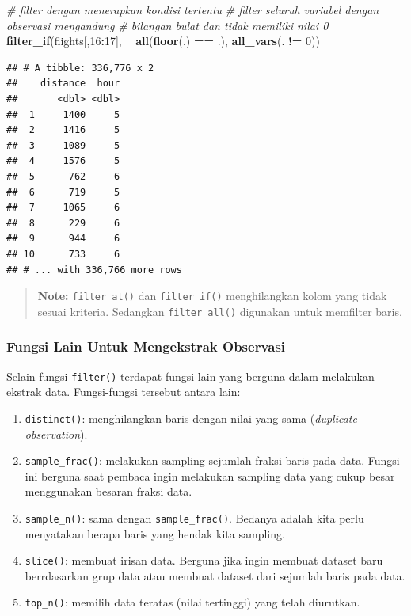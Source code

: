 \documentclass[]{book}
\newenvironment{Shaded}{\begin{snugshade}}{\end{snugshade}}
\newcommand{\KeywordTok}[1]{\textcolor[rgb]{0.13,0.29,0.53}{\textbf{#1}}}
\newcommand{\DecValTok}[1]{\textcolor[rgb]{0.00,0.00,0.81}{#1}}
\newcommand{\StringTok}[1]{\textcolor[rgb]{0.31,0.60,0.02}{#1}}
\newcommand{\CommentTok}[1]{\textcolor[rgb]{0.56,0.35,0.01}{\textit{#1}}}
\newcommand{\OperatorTok}[1]{\textcolor[rgb]{0.81,0.36,0.00}{\textbf{#1}}}
\newcommand{\NormalTok}[1]{#1}
\providecommand{\tightlist}{%
  \setlength{\itemsep}{0pt}\setlength{\parskip}{0pt}}
\begin{document}
\begin{Shaded}
\begin{Highlighting}[]
\CommentTok{# filter dengan menerapkan kondisi tertentu}
\CommentTok{# filter seluruh variabel dengan observasi mengandung}
\CommentTok{# bilangan bulat dan tidak memiliki nilai 0}
\KeywordTok{filter_if}\NormalTok{(flights[,}\DecValTok{16}\OperatorTok{:}\DecValTok{17}\NormalTok{], }\OperatorTok{~}\StringTok{ }\KeywordTok{all}\NormalTok{(}\KeywordTok{floor}\NormalTok{(.) }\OperatorTok{==}\StringTok{ }\NormalTok{.), }\KeywordTok{all_vars}\NormalTok{(. }\OperatorTok{!=}\StringTok{ }\DecValTok{0}\NormalTok{))}
\end{Highlighting}
\end{Shaded}

\begin{verbatim}
## # A tibble: 336,776 x 2
##    distance  hour
##       <dbl> <dbl>
##  1     1400     5
##  2     1416     5
##  3     1089     5
##  4     1576     5
##  5      762     6
##  6      719     5
##  7     1065     6
##  8      229     6
##  9      944     6
## 10      733     6
## # ... with 336,766 more rows
\end{verbatim}

\begin{quote}
\textbf{Note: } \texttt{filter\_at()} dan \texttt{filter\_if()}
menghilangkan kolom yang tidak sesuai kriteria. Sedangkan
\texttt{filter\_all()} digunakan untuk memfilter baris.
\end{quote}

\subsubsection{Fungsi Lain Untuk Mengekstrak
Observasi}\label{fungsi-lain-untuk-mengekstrak-observasi}

Selain fungsi \texttt{filter()} terdapat fungsi lain yang berguna dalam
melakukan ekstrak data. Fungsi-fungsi tersebut antara lain:

\begin{enumerate}
\def\labelenumi{\arabic{enumi}.}
\tightlist
\item
  \texttt{distinct()}: menghilangkan baris dengan nilai yang sama
  (\emph{duplicate observation}).
\item
  \texttt{sample\_frac()}: melakukan sampling sejumlah fraksi baris pada
  data. Fungsi ini berguna saat pembaca ingin melakukan sampling data
  yang cukup besar menggunakan besaran fraksi data.
\item
  \texttt{sample\_n()}: sama dengan \texttt{sample\_frac()}. Bedanya
  adalah kita perlu menyatakan berapa baris yang hendak kita sampling.
\item
  \texttt{slice()}: membuat irisan data. Berguna jika ingin membuat
  dataset baru berrdasarkan grup data atau membuat dataset dari sejumlah
  baris pada data.
\item
  \texttt{top\_n()}: memilih data teratas (nilai tertinggi) yang telah
  diurutkan.
\end{enumerate}
\end{document}
